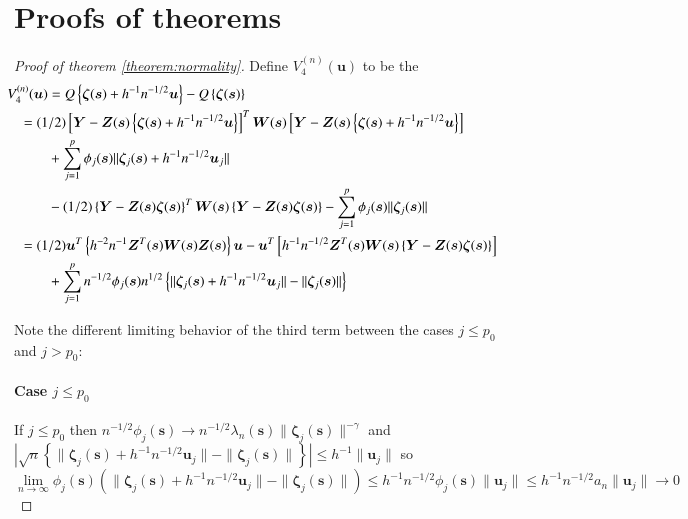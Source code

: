 \documentclass[authoryear, review, 11pt]{elsarticle}
\begin{document}
    \section{Proofs of theorems} \label{app:proofs}
        \begin{proof}[Proof of theorem \ref{theorem:normality}] 
            Define $V_4^{(n)}(\bm{u})$ to be the 
            \begin{align}\label{eq:consistency}
                \mkern-36mu V_4^{(n)}(\bm{u}) &= Q \left\{ \bm{\zeta} (\bm{s}) + h^{-1} n^{-1/2} \bm{u} \right\} - Q \left\{ \bm{\zeta}(\bm{s}) \right\} \notag \\
                &\mkern-36mu= (1/2) \left[ \bm{Y} - \bm{Z}(\bm{s}) \left\{ \bm{\zeta}(\bm{s}) + h^{-1} n^{-1/2} \bm{u} \right\} \right]^T \bm{W}(\bm{s}) \left[ \bm{Y} - \bm{Z}(\bm{s}) \left\{ \bm{\zeta}(\bm{s}) + h^{-1} n^{-1/2} \bm{u} \right\} \right] \notag \\
                &+ \sum_{j=1}^p \phi_j(\bm{s}) \| \bm{\zeta}_j(\bm{s}) + h^{-1} n^{-1/2} \bm{u}_j \| \notag \\
                &- (1/2) \left\{ \bm{Y} - \bm{Z}(\bm{s}) \bm{\zeta}(\bm{s}) \right\}^T \bm{W}(\bm{s}) \left\{ \bm{Y} - \bm{Z}(\bm{s}) \bm{\zeta}(\bm{s}) \right\} - \sum_{j=1}^p \phi_j(\bm{s}) \| \bm{\zeta}_j(\bm{s}) \| \notag \\ 
                &\mkern-36mu= (1/2) \bm{u}^T \left\{ h^{-2} n^{-1} \bm{Z}^T(\bm{s}) \bm{W}(\bm{s}) \bm{Z}(\bm{s}) \right\} \bm{u} - \bm{u}^T \left[ h^{-1} n^{-1/2} \bm{Z}^T(\bm{s}) \bm{W}(\bm{s}) \left\{ \bm{Y} - \bm{Z}(\bm{s}) \bm{\zeta}(\bm{s}) \right\} \right] \notag \\
                &+ \sum_{j=1}^p n^{-1/2} \phi_j(\bm{s}) n^{1/2} \left\{ \|\bm{\zeta}_j(\bm{s}) + h^{-1} n^{-1/2} \bm{u}_j \| - \| \bm{\zeta}_j(\bm{s}) \| \right\}
            \end{align}
        
            Note the different limiting behavior of the third term between the cases $j \le p_0$ and $j > p_0$:
        
            \paragraph{Case $j \le p_0$}
            If $j \le p_0$ then $n^{-1/2} \phi_j(\bm{s}) \to n^{-1/2} \lambda_n(\bm{s}) \| \bm{\zeta}_j(\bm{s}) \|^{-\gamma}$ and $| \sqrt{n} \left\{ \|\bm{\zeta}_j(\bm{s}) + h^{-1} n^{-1/2} \bm{u}_j \| - \| \bm{\zeta}_j(\bm{s}) \| \right\} | \le h^{-1} \| \bm{u}_j \|$ so \[\lim \limits_{n \to \infty} \phi_j(\bm{s}) \left( \|\bm{\zeta}_j(\bm{s}) + h^{-1} n^{-1/2} \bm{u}_j \| - \| \bm{\zeta}_j(\bm{s}) \| \right) \le h^{-1} n^{-1/2} \phi_j(\bm{s})  \| \bm{u}_j \| \le h^{-1} n^{-1/2} a_n \| \bm{u}_j \| \to 0\]


\end{proof}
\end{document}
